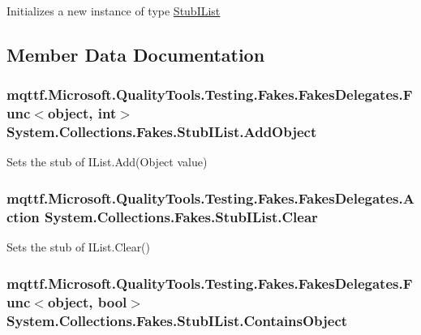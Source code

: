 Initializes a new instance of type \hyperlink{class_system_1_1_collections_1_1_fakes_1_1_stub_i_list}{Stub\-I\-List}



\subsection{Member Data Documentation}
\hypertarget{class_system_1_1_collections_1_1_fakes_1_1_stub_i_list_a93c434d2570207113b14d9f38c0b6ac8}{
\subsubsection[{Add\-Object}]{\setlength{\rightskip}{0pt plus 5cm}mqttf.\-Microsoft.\-Quality\-Tools.\-Testing.\-Fakes.\-Fakes\-Delegates.\-Func$<$object, int$>$ System.\-Collections.\-Fakes.\-Stub\-I\-List.\-Add\-Object}}\label{class_system_1_1_collections_1_1_fakes_1_1_stub_i_list_a93c434d2570207113b14d9f38c0b6ac8}


Sets the stub of I\-List.\-Add(\-Object value)

\hypertarget{class_system_1_1_collections_1_1_fakes_1_1_stub_i_list_a2a5232d5477f2a8cfba2d45e7b8ab164}{
\subsubsection[{Clear}]{\setlength{\rightskip}{0pt plus 5cm}mqttf.\-Microsoft.\-Quality\-Tools.\-Testing.\-Fakes.\-Fakes\-Delegates.\-Action System.\-Collections.\-Fakes.\-Stub\-I\-List.\-Clear}}\label{class_system_1_1_collections_1_1_fakes_1_1_stub_i_list_a2a5232d5477f2a8cfba2d45e7b8ab164}


Sets the stub of I\-List.\-Clear()

\hypertarget{class_system_1_1_collections_1_1_fakes_1_1_stub_i_list_aa6021fbb2dcc379e2e343d36db8a96eb}{
\subsubsection[{Contains\-Object}]{\setlength{\rightskip}{0pt plus 5cm}mqttf.\-Microsoft.\-Quality\-Tools.\-Testing.\-Fakes.\-Fakes\-Delegates.\-Func$<$object, bool$>$ System.\-Collections.\-Fakes.\-Stub\-I\-List.\-Contains\-Object}}\label{class_system_1_1_collections_1_1_fakes_1_1_stub_i_list_aa6021fbb2dcc379e2e343d36db8a96eb}


